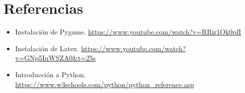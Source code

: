 \documentclass{article}
\begin{document}
\clearpage

\section{Referencias}
\begin{itemize}			
	\item Instalación de Pygame. \url{https://www.youtube.com/watch?v=RRir1Ok0pfI}
	\item Instalación de Latex. \url{https://www.youtube.com/watch?v=GNp5IuWSZA0&t=25s}
		\item Introducción a Python. \url{https://www.w3schools.com/python/python_reference.asp}
\end{itemize}
	
%
%
%
			
\end{document}

